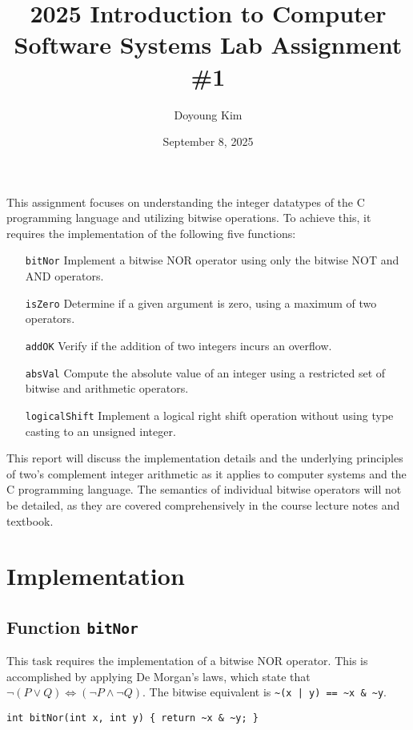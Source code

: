 \documentclass{article}
\title{\textbf{2025 Introduction to Computer Software Systems Lab Assignment
\#1}}
\date{September 8, 2025}
\author{Doyoung Kim}
\def\til{\texttt{\~}}
\begin{document}
\maketitle

This assignment focuses on understanding the integer datatypes of the C
programming language and utilizing bitwise operations. To achieve this, it
requires the implementation of the following five functions:

\begin{enumerate}
    \item[\texttt{bitNor}] Implement a bitwise NOR operator using only the 
    bitwise NOT and AND operators.
    \item[\texttt{isZero}] Determine if a given argument is zero, using a 
    maximum of two operators.
    \item[\texttt{addOK}] Verify if the addition of two integers incurs an
    overflow.
    \item[\texttt{absVal}] Compute the absolute value of an integer using a
    restricted set of bitwise and arithmetic operators.
    \item[\texttt{logicalShift}] Implement a logical right shift operation
    without using type casting to an unsigned integer.
\end{enumerate}

This report will discuss the implementation details and the underlying
principles of two's complement integer arithmetic as it applies to computer
systems and the C programming language. The semantics of individual bitwise
operators will not be detailed, as they are covered comprehensively in the
course lecture notes and textbook.

\section{Implementation}

\subsection{Function \texttt{bitNor}}

This task requires the implementation of a bitwise NOR operator. This is
accomplished by applying De Morgan's laws, which state that
$\neg(P \lor Q) \iff (\neg P \land \neg Q)$. The bitwise equivalent is
\texttt{\til(x | y) == \til x \& \til y}.

\begin{verbatim}
int bitNor(int x, int y) { return ~x & ~y; }
\end{verbatim}
\end{document}

